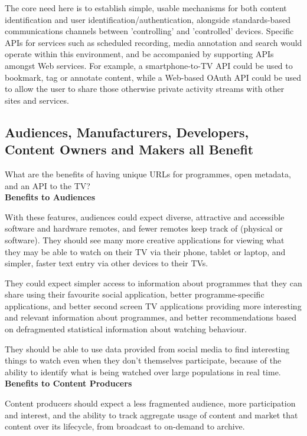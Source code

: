 \documentclass[]{article}%
\begin{document}
The core need here is to establish simple, usable mechanisms for both content identification and user identification/authentication, alongside standards-based communications channels between 'controlling' and 'controlled' devices. Specific APIs for services such as scheduled recording, media annotation and search would operate within this environment, and be accompanied by supporting APIs amongst Web services. For example, a smartphone-to-TV API could be used to bookmark, tag or annotate content, while a Web-based OAuth API could be used to allow the user to share those otherwise private activity streams with other sites and services.

\subsection{Audiences, Manufacturers, Developers, Content Owners and Makers all Benefit}

What are the benefits of having unique URLs for programmes, open metadata, and an API to the TV?
\\

{\bf{Benefits to Audiences}}

With these features, audiences could expect diverse, attractive and accessible software and hardware remotes, and fewer remotes keep track of (physical or software). They should see many more creative applications for viewing what they may be able to watch on their TV via their phone, tablet or laptop, and simpler, faster text entry via other devices to their TVs. 

They could expect simpler access to information about programmes that they can share using their favourite social application, better programme-specific applications, and better second screen TV applications providing more interesting and relevant information about programmes, and better recommendations based on defragmented statistical information about watching behaviour.

They should be able to use data provided from social media to find interesting things to watch even when they don't themselves participate, because of the ability to identify what is being watched over large populations in real time.
\\

{\bf{Benefits to Content Producers}}

Content producers should expect a less fragmented audience, more participation and interest, and the ability to track aggregate usage of content and market that content over its lifecycle, from broadcast to on-demand to archive.
\\
\end{document}
